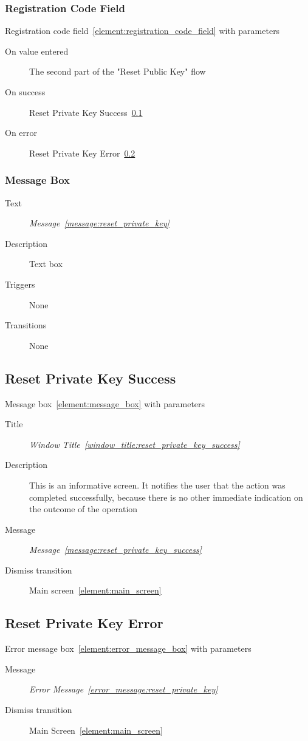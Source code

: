 \documentclass[a4paper,10pt]{article}
\newcommand{\windowTitleLabelText}{Window Title}
\newcommand{\windowTitleLabel}{window_title:}
\DeclareRobustCommand{\windowTitleRef}[1]{%
   \emph{\windowTitleLabelText~\ref{\windowTitleLabel#1}}}
\newcommand{\messageLabelText}{Message}
\newcommand{\messageLabel}{message:}
\DeclareRobustCommand{\messageTextRef}[1]{%
   \emph{\messageLabelText~\ref{\messageLabel#1}}}
\newcommand{\errorMessageLabelText}{Error Message}
\newcommand{\errorMessageLabel}{error_message:}
\DeclareRobustCommand{\errorMessageTextRef}[1]{%
   \emph{\errorMessageLabelText~\ref{\errorMessageLabel#1}}}
\newcommand{\elementLabel}{element:}
\DeclareRobustCommand{\element}[2]{\subsection{#1}\label{\elementLabel#2}}
\DeclareRobustCommand{\elementRef}[1]{\ref{\elementLabel#1}}
\begin{document}
\subsubsection{Registration Code Field}
Registration code field~\elementRef{registration_code_field} with parameters
\begin{description}
 \item[On value entered] The second part of the "Reset Public Key" flow
 \item[On success] Reset Private Key 
Success~\elementRef{reset_private_key_success}
 \item[On error] Reset Private Key Error~\elementRef{reset_private_key_error}
\end{description}

\subsubsection{Message Box}
\begin{description}
 \item[Text] \messageTextRef{reset_private_key}
 \item[Description] Text box
 \item[Triggers] None
 \item[Transitions] None
\end{description}

\element{Reset Private Key Success}{reset_private_key_success}
Message box~\elementRef{message_box} with parameters
\begin{description}
 \item[Title] \windowTitleRef{reset_private_key_success}
 \item[Description] This is an informative screen. It notifies the user that 
the action was completed successfully, because there is no other immediate 
indication on the outcome of the operation
 \item[Message] \messageTextRef{reset_private_key_success}
 \item[Dismiss transition] Main screen~\elementRef{main_screen}
\end{description}

\element{Reset Private Key Error}{reset_private_key_error}
Error message box~\elementRef{error_message_box} with parameters
\begin{description}
 \item[Message] \errorMessageTextRef{reset_private_key}
 \item[Dismiss transition] Main Screen~\elementRef{main_screen}
\end{description}
\end{document}
